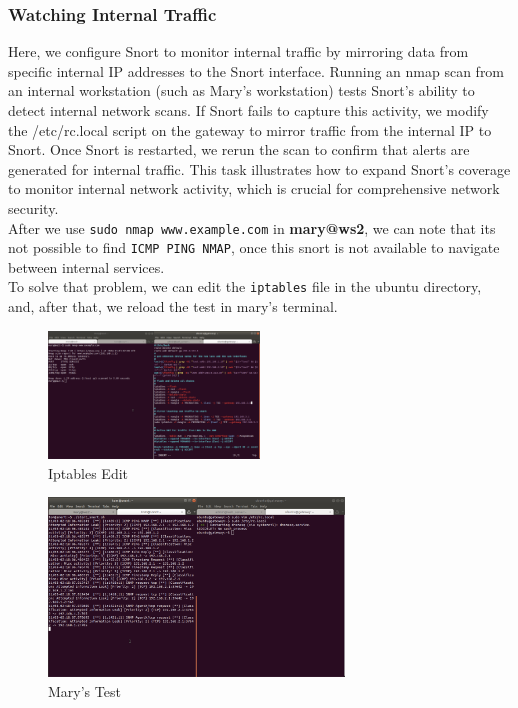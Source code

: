 \documentclass[a4paper,11pt]{article} %
\begin{document}
\subsubsection{Watching Internal Traffic}
Here, we configure Snort to monitor internal traffic by mirroring data from specific internal IP addresses to the Snort interface. Running an nmap scan from an internal workstation (such as Mary’s workstation) tests Snort’s ability to detect internal network scans. If Snort fails to capture this activity, we modify the /etc/rc.local script on the gateway to mirror traffic from the internal IP to Snort. Once Snort is restarted, we rerun the scan to confirm that alerts are generated for internal traffic. This task illustrates how to expand Snort’s coverage to monitor internal network activity, which is crucial for comprehensive network security.\\
After we use \texttt{sudo nmap www.example.com} in \textbf{mary@ws2}, we can note that its not possible to find \texttt{ICMP PING NMAP}, once this snort is not available to navigate between internal services.\\
To solve that problem, we can edit the \texttt{iptables} file in the ubuntu directory, and, after that, we reload the test in mary's terminal.

\begin{figure}[h!]
    \centering
    \includegraphics[width=0.5\textwidth]{images/22.png}
    \caption{Iptables Edit}
\end{figure}

\break 

\begin{figure}[h!]
    \centering
    \includegraphics[width=0.7\textwidth]{images/23.png}
    \caption{Mary's Test}
\end{figure}
\end{document}
